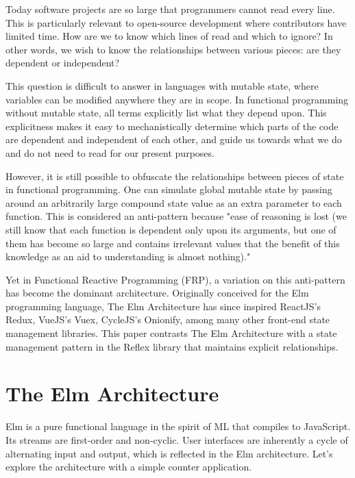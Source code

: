 \documentclass[sigconf]{acmart}
\begin{document}
Today software projects are so large that programmers cannot read every line. This is particularly relevant to open-source development where contributors have limited time. How are we to know which lines of read  and which to ignore? In other words, we wish to know the relationships between various pieces: are they dependent or independent?

This question is difficult to answer in languages with mutable state, where variables can be modified anywhere they are in scope. In functional programming without mutable state, all terms explicitly list what they depend upon. This explicitness makes it easy to mechanistically determine which parts of the code are dependent and independent of each other, and guide us towards what we do and do not need to read for our present purposes.

However, it is still possible to obfuscate the relationships between pieces of state in functional programming. One can simulate global mutable state by passing around an arbitrarily large compound state value as an extra parameter to each function. This is considered an anti-pattern because "ease of reasoning is lost (we still know that each function is dependent only upon its arguments, but one of them has become so large and contains irrelevant values that the benefit of this knowledge as an aid to understanding is almost nothing)." \cite{moseley2006out}

Yet in Functional Reactive Programming (FRP), a variation on this anti-pattern has become the dominant architecture. Originally conceived for the Elm programming language, The Elm Architecture has since inspired ReactJS's Redux, VueJS's Vuex, CycleJS's Onionify, among many other front-end state management libraries. This paper contrasts The Elm Architecture with a state management pattern in the Reflex library that maintains explicit relationships.

\section{The Elm Architecture}

Elm is a pure functional language in the spirit of ML that compiles to JavaScript. Its streams are first-order and non-cyclic. User interfaces are inherently a cycle of alternating input and output, which is reflected in the Elm architecture. Let's explore the architecture with a simple counter application.
\end{document}
